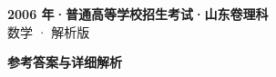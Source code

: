 \documentclass[zihao=-4, a4paper]{ctexart}
\begin{document}
\begin{center}
  {\Large\bfseries 2006 年·普通高等学校招生考试·山东卷理科}\\[4pt]
  {\large 数学 · 解析版}
\end{center}
\medskip
{}

\clearpage
{}
\begin{center}{\Large\bfseries 参考答案与详细解析}\end{center}
\medskip

\end{document}
